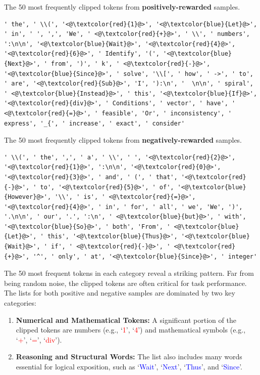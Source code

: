 \begin{AIbox}{The 50 most frequently clipped tokens from \textbf{positively-rewarded} samples.}
\begin{lstlisting}
' the', ' \\(', '<@\textcolor{red}{1}@>', '<@\textcolor{blue}{Let}@>', ' in', ' ', ',', 'We', ' <@\textcolor{red}{+}@>', ' \\', ' numbers', ':\n\n', '<@\textcolor{blue}{Wait}@>', '<@\textcolor{red}{4}@>', '<@\textcolor{red}{6}@>', ' Identify', '(', '<@\textcolor{blue}{Next}@>', ' from', ')', ' k', ' <@\textcolor{red}{-}@>', '<@\textcolor{blue}{Since}@>', ' solve', '\\[', ' how', ' ->', ' to', ' are', '<@\textcolor{red}{Sub}@>', 'I', '):\n', '  \n\n', ' spiral', ' <@\textcolor{blue}{Instead}@>', ' this', '<@\textcolor{blue}{If}@>', '<@\textcolor{red}{div}@>', ' Conditions', ' vector', ' have', ' <@\textcolor{red}{=}@>', ' feasible', 'Or', ' inconsistency', ' express', '_{', ' increase', ' exact', ' consider'
\end{lstlisting}
\end{AIbox}



\begin{AIbox}{The 50 most frequently clipped tokens from \textbf{negatively-rewarded} samples.}
\begin{lstlisting}
' \\(', ' the', ',', ' a', ' \\', ' ', '<@\textcolor{red}{2}@>', '<@\textcolor{red}{1}@>', ':\n\n', '<@\textcolor{red}{0}@>', '<@\textcolor{red}{3}@>', ' and', ' (', ' that', '<@\textcolor{red}{-}@>', ' to', '<@\textcolor{red}{5}@>', ' of', '<@\textcolor{blue}{However}@>', '\\', ' is', ' <@\textcolor{red}{=}@>', '<@\textcolor{red}{4}@>', ' in', ' for', ' all', ' we', 'We', ')', '.\n\n', ' our', '.', ':\n', ' <@\textcolor{blue}{but}@>', ' with', '<@\textcolor{blue}{So}@>', ' both', 'From', ' <@\textcolor{blue}{Let}@>', ' this', '<@\textcolor{blue}{Thus}@>', '<@\textcolor{blue}{Wait}@>', ' if', ' <@\textcolor{red}{-}@>', ' <@\textcolor{red}{+}@>', '^', ' only', ' at', '<@\textcolor{blue}{Since}@>', ' integer'
\end{lstlisting}
\end{AIbox}


The 50 most frequent tokens in each category reveal a striking pattern. Far from being random noise, the clipped tokens are often critical for task performance. The lists for both positive and negative samples are dominated by two key categories:  
\begin{enumerate}  
    \item \textbf{Numerical and Mathematical Tokens:} A significant portion of the clipped tokens are numbers (e.g., `\textcolor{red}{1}', `\textcolor{red}{4}') and mathematical symbols (e.g., `\textcolor{red}{+}', `\textcolor{red}{=}', `\textcolor{red}{div}').  
    \item \textbf{Reasoning and Structural Words:} The list also includes many words essential for logical exposition, such as `\textcolor{blue}{Wait}', `\textcolor{blue}{Next}', `\textcolor{blue}{Thus}', and `\textcolor{blue}{Since}'.  
\end{enumerate}
  
